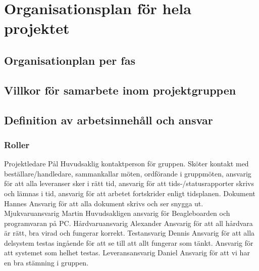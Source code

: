 \section{Organisationsplan för hela projektet}

\subsection{Organisationplan per fas}

\subsection{Villkor för samarbete inom projektgruppen}

\subsection{Definition av arbetsinnehåll och ansvar}


\subsubsection{Roller}
Projektledare	Pål
	Huvudsaklig kontaktperson för gruppen. Sköter kontakt med beställare/handledare, sammankallar möten, ordförande i gruppmöten, ansvarig för att alla leveranser sker i rätt tid, ansvarig för att tids-/statusrapporter skrivs och lämnas i tid, ansvarig för att arbetet fortskrider enligt tidsplanen.
Dokument	Hannes
	Ansvarig för att alla dokument skrivs och ser snygga ut. 
Mjukvaruansvarig	Martin
	Huvudsakligen ansvarig för Beagleboarden och programvaran på PC.
Hårdvaruansvarig	Alexander
	Ansvarig för att all hårdvara är rätt, bra virad och fungerar korrekt.
Testansvarig	Dennis
	Ansvarig för att alla delsystem testas ingående för att se till att allt fungerar som tänkt. Ansvarig för att systemet som helhet testas.
Leveransansvarig	Daniel
	Ansvarig för att vi har en bra stämning i gruppen.